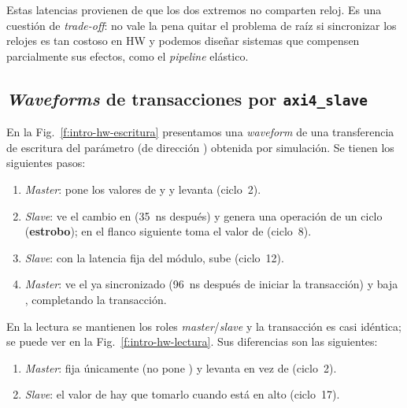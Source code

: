 Estas latencias provienen de que los dos extremos no comparten reloj. Es una
cuestión de \emph{trade-off}: no vale la pena quitar el problema de raíz si sincronizar
los relojes es tan costoso en HW y podemos diseñar sistemas que compensen
parcialmente sus efectos, como el \emph{pipeline} elástico.

\subsection{\emph{Waveforms} de transacciones por \texttt{axi4\_slave}}
\label{S:intro-hw-waveforms-axi}

En la Fig.~\ref{f:intro-hw-escritura} presentamos una \emph{waveform} de una
transferencia de escritura del parámetro  (de dirección
) obtenida por simulación. Se tienen los siguientes pasos:
\begin{enumerate}
  \item \emph{Master}: pone los valores de  y  y levanta
     (ciclo~2).
  \item \emph{Slave}: ve el cambio en  (\qty{35}{\nano\second} después) y
    genera una operación de un ciclo (\textbf{estrobo}); en el flanco siguiente
     toma el valor de  (ciclo~8).
  \item \emph{Slave}: con la latencia fija del módulo, sube 
    (ciclo~12).
  \item \emph{Master}: ve el  ya sincronizado (\qty{96}{\nano\second}
    después de iniciar la transacción) y baja , completando la
    transacción.
\end{enumerate}

En la lectura se mantienen los roles \emph{master}/\emph{slave} y la transacción es casi
idéntica; se puede ver en la Fig.~\ref{f:intro-hw-lectura}. Sus diferencias son
las siguientes:
\begin{enumerate}
  \item \emph{Master}: fija únicamente  (no pone ) y
    levanta  en vez de  (ciclo~2).
  \item \emph{Slave}: el valor de  hay que tomarlo cuando 
    está en alto (ciclo~17).
\end{enumerate}

